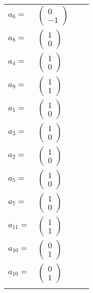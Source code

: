\documentclass[1p]{elsarticle_modified}
\theoremstyle{definition}
\begin{document}
\begin{tabular}{m{7pt} m{180pt} m{7pt} m{180pt} }
\flushright $a_{6}=$&$\begin{pmatrix}0\\-1\end{pmatrix}$ \\
\flushright $a_{8}=$&$\begin{pmatrix}1\\0\end{pmatrix}$ \\
\flushright $a_{4}=$&$\begin{pmatrix}1\\0\end{pmatrix}$ \\
\flushright $a_{9}=$&$\begin{pmatrix}1\\1\end{pmatrix}$ \\
\flushright $a_{1}=$&$\begin{pmatrix}1\\0\end{pmatrix}$ \\
\flushright $a_{3}=$&$\begin{pmatrix}1\\0\end{pmatrix}$ \\
\flushright $a_{2}=$&$\begin{pmatrix}1\\0\end{pmatrix}$ \\
\flushright $a_{5}=$&$\begin{pmatrix}1\\0\end{pmatrix}$ \\
\flushright $a_{7}=$&$\begin{pmatrix}1\\0\end{pmatrix}$ \\
\flushright $a_{11}=$&$\begin{pmatrix}1\\1\end{pmatrix}$ \\
\flushright $a_{10}=$&$\begin{pmatrix}0\\1\end{pmatrix}$\\ \flushright $a_{10}=$&$\begin{pmatrix}0\\1\end{pmatrix}$\\&\end{tabular}
\end{document}
